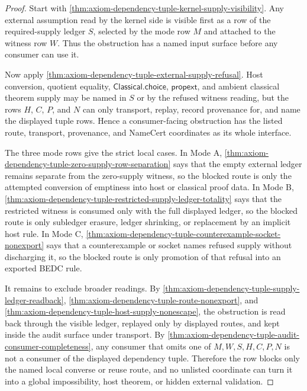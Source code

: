 \begin{proof}
Start with \autoref{thm:axiom-dependency-tuple-kernel-supply-visibility}. Any
external assumption read by the kernel side is visible first as a row of the
required-supply ledger $S$, selected by the mode row $M$ and attached to the
witness row $W$. Thus the obstruction has a named input surface before any
consumer can use it.

Now apply \autoref{thm:axiom-dependency-tuple-external-supply-refusal}. Host
conversion, quotient equality, $\mathsf{Classical.choice}$, $\mathsf{propext}$,
and ambient classical theorem supply may be named in $S$ or by the refused
witness reading, but the rows $H$, $C$, $P$, and $N$ can only transport,
replay, record provenance for, and name the displayed tuple rows. Hence a
consumer-facing obstruction has the listed route, transport, provenance, and
NameCert coordinates as its whole interface.

The three mode rows give the strict local cases. In Mode A,
\autoref{thm:axiom-dependency-tuple-zero-supply-row-separation} says that the
empty external ledger remains separate from the zero-supply witness, so the
blocked route is only the attempted conversion of emptiness into host or
classical proof data. In Mode B,
\autoref{thm:axiom-dependency-tuple-restricted-supply-ledger-totality} says that
the restricted witness is consumed only with the full displayed ledger, so the
blocked route is only subledger erasure, ledger shrinking, or replacement by an
implicit host rule. In Mode C,
\autoref{thm:axiom-dependency-tuple-counterexample-socket-nonexport} says that a
counterexample or socket names refused supply without discharging it, so the
blocked route is only promotion of that refusal into an exported BEDC rule.

It remains to exclude broader readings. By
\autoref{thm:axiom-dependency-tuple-supply-ledger-readback},
\autoref{thm:axiom-dependency-tuple-route-nonexport}, and
\autoref{thm:axiom-dependency-tuple-host-supply-nonescape}, the obstruction is
read back through the visible ledger, replayed only by displayed routes, and
kept inside the audit surface under transport. By
\autoref{thm:axiom-dependency-tuple-audit-consumer-completeness}, any consumer
that omits one of $M,W,S,H,C,P,N$ is not a consumer of the displayed dependency
tuple. Therefore the row blocks only the named local converse or reuse route,
and no unlisted coordinate can turn it into a global impossibility, host
theorem, or hidden external validation.
\end{proof}
